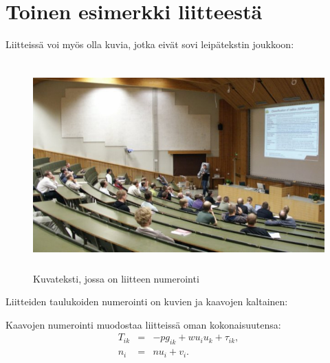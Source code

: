\documentclass[finnish,12pt,a4paper,pdftex]{article}
\begin{document}
\clearpage
\section{Toinen esimerkki liitteestä\label{LiiteB}}

\renewcommand{\theequation}{B\arabic{equation}}
\setcounter{equation}{0}  
\renewcommand{\thefigure}{B\arabic{figure}}
\setcounter{figure}{0}
\renewcommand{\thetable}{B\arabic{table}}
\setcounter{table}{0}

Liitteissä voi myös olla kuvia, jotka
eivät sovi leipätekstin joukkoon:
\begin{figure}[htb]
\begin{center}
\includegraphics[height=8cm]{kuva2}
\end{center}
\caption{Kuvateksti, jossa on liitteen numerointi \label{liitekuva}}
\end{figure}
Liitteiden taulukoiden numerointi on kuvien ja kaavojen kaltainen:
\begin{table}[htb]
\caption{Taulukon kuvateksti. \label{liitetaulukko}}
\begin{center}
\end{center}
\end{table}
Kaavojen numerointi muodostaa liitteissä oman kokonaisuutensa:
\begin{eqnarray}
T_{ik} &=& -p g_{ik} + w u_i u_k + \tau_{ik},  \label{liitekaava3} \\
n_i    &=& n u_i + v_i.                        \label{liitekaava4}
\end{eqnarray}
\end{document}
